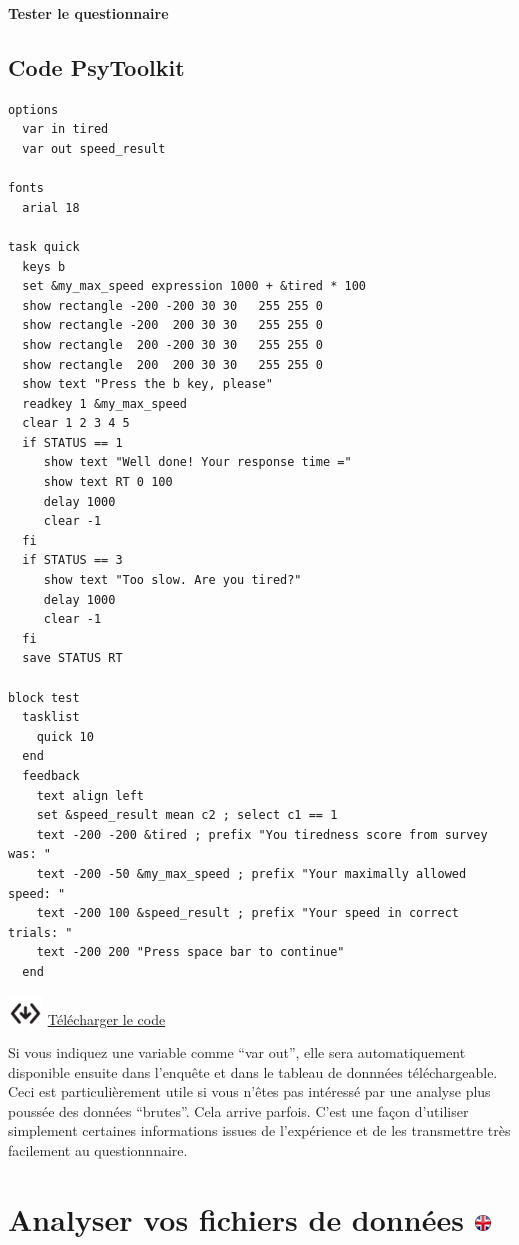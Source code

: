 \documentclass[
]{book}
\begin{document}
\textbf{Tester le questionnaire}

\hypertarget{code-psytoolkit}{%
\section{Code PsyToolkit}\label{code-psytoolkit}}

\begin{verbatim}
options
  var in tired
  var out speed_result

fonts
  arial 18

task quick
  keys b
  set &my_max_speed expression 1000 + &tired * 100
  show rectangle -200 -200 30 30   255 255 0
  show rectangle -200  200 30 30   255 255 0
  show rectangle  200 -200 30 30   255 255 0
  show rectangle  200  200 30 30   255 255 0
  show text "Press the b key, please"
  readkey 1 &my_max_speed
  clear 1 2 3 4 5
  if STATUS == 1
     show text "Well done! Your response time ="
     show text RT 0 100
     delay 1000
     clear -1
  fi
  if STATUS == 3
     show text "Too slow. Are you tired?"
     delay 1000
     clear -1
  fi
  save STATUS RT

block test
  tasklist
    quick 10
  end
  feedback
    text align left
    set &speed_result mean c2 ; select c1 == 1
    text -200 -200 &tired ; prefix "You tiredness score from survey was: "
    text -200 -50 &my_max_speed ; prefix "Your maximally allowed speed: "
    text -200 100 &speed_result ; prefix "Your speed in correct trials: "
    text -200 200 "Press space bar to continue"
  end
\end{verbatim}

\includegraphics{img/codedownload.png}
\href{https://www.psytoolkit.org/lessons/speed_measure.zip}{Télécharger
le code}

Si vous indiquez une variable comme ``var out'', elle sera
automatiquement disponible ensuite dans l'enquête et dans le tableau de
donnnées téléchargeable. Ceci est particulièrement utile si vous n'êtes
pas intéressé par une analyse plus poussée des données ``brutes''. Cela
arrive parfois. C'est une façon d'utiliser simplement certaines
informations issues de l'expérience et de les transmettre très
facilement au questionnnaire.

\hypertarget{analyser-vos-fichiers-de-donnuxe9es}{%
\chapter[Analyser vos fichiers de données ]{\texorpdfstring{Analyser vos
fichiers de données
\href{https://www.psytoolkit.org/doc3.1.0/analyze_data.html}{\protect\includegraphics{img/ukflag.png}}}{Analyser vos fichiers de données }}\label{analyser-vos-fichiers-de-donnuxe9es}}
\end{document}
